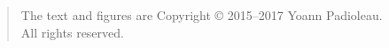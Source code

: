 \begin{quote}
The text and figures are Copyright \copyright{} 2015--2017 Yoann Padioleau.\\
All rights reserved.
\end{quote}

